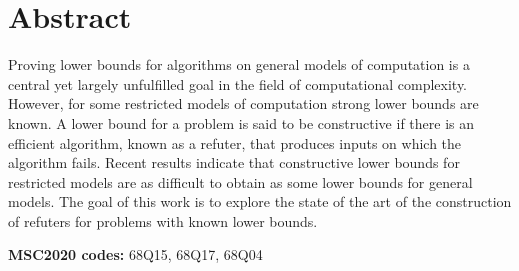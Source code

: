 \section*{Abstract}

Proving lower bounds for algorithms on general models of computation is a central yet
largely unfulfilled goal in the field of computational complexity. 
However, for some restricted models of computation strong lower bounds are known.
A lower bound for a problem is said to be constructive if there is an efficient algorithm, 
known as a refuter, that produces inputs on which the algorithm fails. 
Recent results indicate that constructive lower bounds for restricted models are 
as difficult to obtain as some lower bounds for general models. 
The goal of this work is to explore the state of the art of the construction of refuters 
for problems with known lower bounds.


\textbf{MSC2020 codes:} 68Q15, 68Q17, 68Q04